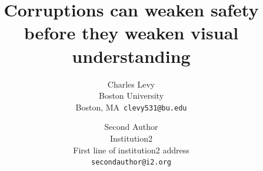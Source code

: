 \documentclass[10pt,twocolumn,letterpaper]{article}
\title{Corruptions can weaken safety before they weaken visual understanding}
\author{Charles Levy\\
Boston University\\
Boston, MA\
{\tt\small clevy531@bu.edu}
\and
Second Author\\
Institution2\\
First line of institution2 address\\
{\tt\small secondauthor@i2.org}
}
\begin{document}
\maketitle







{
    \small
    
    
}
\end{document}
